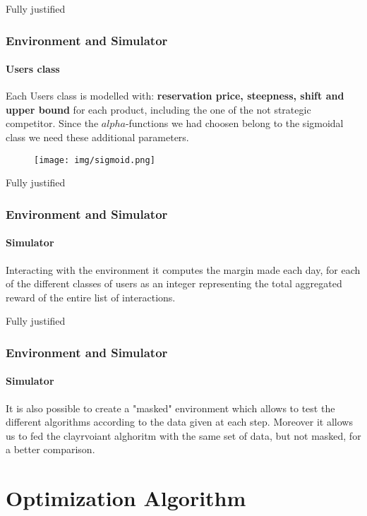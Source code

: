 \documentclass{beamer}
\begin{document}

\begin {frame}{Fully justified}

\frametitle{Environment and Simulator}
\framesubtitle{Users class}
Each Users class is modelled with:\textbf{ reservation price, steepness, shift and upper bound}
for each product, including the one of the not strategic competitor.
Since the $alpha$-functions we had choosen belong to the sigmoidal class we need these additional parameters.

\begin{figure}[⟨b⟩]  
\texttt{[image: img/sigmoid.png]}
    \end{figure}
\end {frame}


\begin {frame}{Fully justified}

\frametitle{Environment and Simulator}
\framesubtitle{Simulator}
Interacting with the environment it computes the margin made each day, for each of the different classes of users as an integer representing the total aggregated reward of the entire list of interactions.

\end{frame}


\begin {frame}{Fully justified}

\frametitle{Environment and Simulator}
\framesubtitle{Simulator}
It is also possible to create a "masked" environment which allows to test the different algorithms according to the data given at each step. Moreover it allows us to fed the clayrvoiant alghoritm with the same set of data, but not masked, for a better comparison.

\end{frame}


\AtBeginSection[]
{
\begin{frame}{}
    \tableofcontents[currentsection]
\end{frame}
}


\section{Optimization Algorithm}
\end{document}
